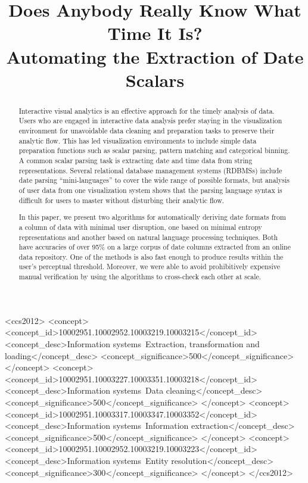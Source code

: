 \documentclass{sig-alternate-05-2015}
\begin{document}
\title{Does Anybody Really Know What Time It Is?\\
Automating the Extraction of Date Scalars}


\maketitle

\begin{abstract}
Interactive visual analytics is an effective approach for the timely analysis of data. Users who are engaged in interactive data analysis prefer staying in the visualization environment for unavoidable data cleaning and preparation tasks to preserve their analytic flow. This has led visualization environments to include simple data preparation functions such as scalar parsing, pattern matching and categorical binning. A common scalar parsing task is extracting date and time data from string representations. Several relational database management systems (RDBMSs) include date parsing ``mini-languages'' to cover the wide range of possible formats, but analysis of user data from one visualization system shows that the parsing language syntax is difficult for users to master without disturbing their analytic flow.

In this paper, we present two algorithms for automatically deriving date formats from a column of data with minimal user disruption, one based on minimal entropy representations and another based on natural language processing techniques. Both have accuracies of over 95\% on a large corpus of date columns extracted from an online data repository. One of the methods is also fast enough to produce results within the user's perceptual threshold. Moreover, we were able to avoid prohibitively expensive manual verification by using the algorithms to cross-check each other at scale.
\end{abstract}

%
%
\begin{CCSXML}
<ccs2012>
<concept>
<concept_id>10002951.10002952.10003219.10003215</concept_id>
<concept_desc>Information systems~Extraction, transformation and loading</concept_desc>
<concept_significance>500</concept_significance>
</concept>
<concept>
<concept_id>10002951.10003227.10003351.10003218</concept_id>
<concept_desc>Information systems~Data cleaning</concept_desc>
<concept_significance>500</concept_significance>
</concept>
<concept>
<concept_id>10002951.10003317.10003347.10003352</concept_id>
<concept_desc>Information systems~Information extraction</concept_desc>
<concept_significance>500</concept_significance>
</concept>
<concept>
<concept_id>10002951.10002952.10003219.10003223</concept_id>
<concept_desc>Information systems~Entity resolution</concept_desc>
<concept_significance>300</concept_significance>
</concept>
</ccs2012>
\end{CCSXML}
\end{document}
